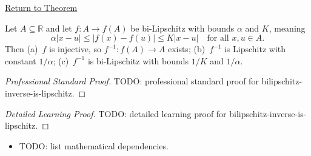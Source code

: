 \newpage
{}
\label{prf:bilipschitz-inverse-is-lipschitz}

\begin{remark*}[Return]
\hyperref[thm:bilipschitz-inverse-is-lipschitz]{Return to Theorem}
\end{remark*}

\begin{theorem*}
Let $A \subseteq \mathbb{R}$ and let $f : A \to f(A)$ be bi-Lipschitz with bounds $\alpha$ and $K$, meaning
\[
  \alpha|x - u| \leq |f(x) - f(u)| \leq K|x - u|
  \quad \text{for all } x, u \in A.
\]
Then (a)~$f$ is injective, so $f^{-1} : f(A) \to A$ exists; (b)~$f^{-1}$ is Lipschitz with constant $1/\alpha$; (c)~$f^{-1}$ is bi-Lipschitz with bounds $1/K$ and $1/\alpha$.
\end{theorem*}

\begin{proof}[Professional Standard Proof]
\LRAProofBodyStart
TODO: professional standard proof for bilipschitz-inverse-is-lipschitz.
\end{proof}

\begin{proof}[Detailed Learning Proof]
\LRAProofBodyStart
TODO: detailed learning proof for bilipschitz-inverse-is-lipschitz.
\end{proof}

\begin{remark*}
\end{remark*}

\begin{dependencies}
\begin{itemize}
  \item TODO: list mathematical dependencies.
\end{itemize}
\end{dependencies}

\clearpage
